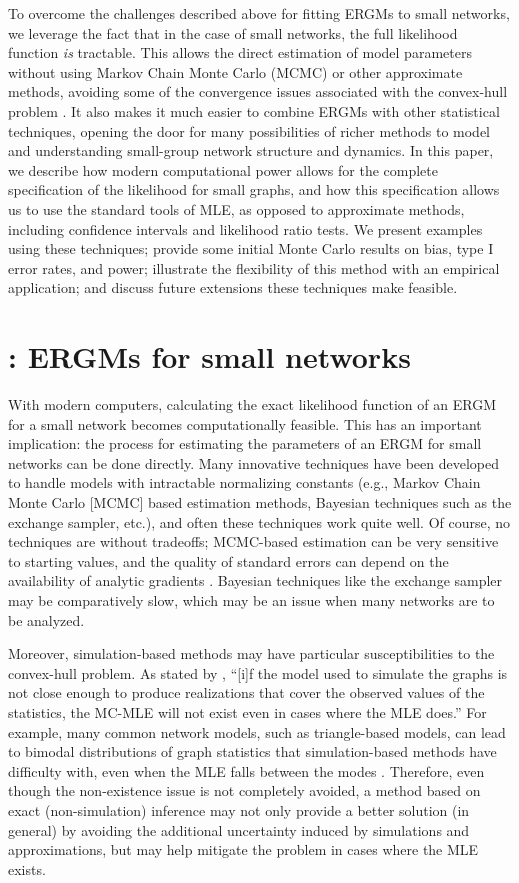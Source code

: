 \documentclass[review, nonatbib,doubleblind]{elsarticle/elsarticle}
\begin{document}
To overcome the challenges described above for fitting ERGMs to small networks, we leverage the fact that in the case of small networks, the full likelihood function \textit{is} tractable. This allows the direct estimation of model parameters without using Markov Chain Monte Carlo (MCMC) or other approximate methods, avoiding some of the convergence issues associated with the convex-hull problem \cite{Handcock2003}. It also makes it much easier to combine ERGMs with other statistical techniques, opening the door for many possibilities of richer methods to model and understanding small-group network structure and dynamics. In this paper, we describe how modern computational power allows for the complete specification of the likelihood for small graphs, and how this specification allows us to use the standard tools of MLE, as opposed to approximate methods, including confidence intervals and likelihood ratio tests. We present examples using these techniques; provide some initial Monte Carlo results on bias, type I error rates, and power; illustrate the flexibility of this method with an empirical application; and discuss future extensions these techniques make feasible.

\section{\ergmitos{}: ERGMs for small networks}

With modern computers, calculating the exact likelihood function of an ERGM for a small network becomes computationally feasible. This has an important implication: the process for estimating the parameters of an ERGM for small networks can be done directly. Many innovative techniques have been developed to handle models with intractable normalizing constants (e.g., Markov Chain Monte Carlo [MCMC] based estimation methods, Bayesian techniques such as the exchange sampler, etc.), and often these techniques work quite well. Of course, no techniques are without tradeoffs; MCMC-based estimation can be very sensitive to starting values, and the quality of standard errors can depend on the availability of analytic gradients \cite{Park2018}. Bayesian techniques like the exchange sampler \cite{Moller2006} may be comparatively slow, which may be an issue when many networks are to be analyzed.

Moreover, simulation-based methods may have particular susceptibilities to the convex-hull problem. As stated by \cite[p. 7]{Handcock2003}, ``[i]f the model used to simulate the graphs is not close enough to produce realizations that cover the observed values of the statistics, the MC-MLE will not exist even in cases where the MLE does.'' For example, many common network models, such as triangle-based models, can lead to bimodal distributions of graph statistics that simulation-based methods have difficulty with, even when the MLE falls between the modes \cite{Hunteretal2012}. Therefore, even though the non-existence issue is not completely avoided, a method based on exact (non-simulation) inference may not only provide a better solution (in general) by avoiding the additional uncertainty induced by simulations and approximations, but may help mitigate the problem in cases where the MLE exists.
\end{document}
